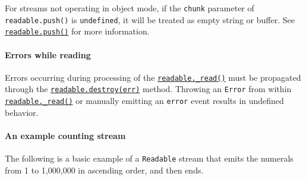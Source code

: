 For streams not operating in object mode, if the \texttt{chunk}
parameter of \texttt{readable.push()} is \texttt{undefined}, it will be
treated as empty string or buffer. See
\hyperref[readablepush]{\texttt{readable.push(\textquotesingle{}\textquotesingle{})}}
for more information.

\paragraph{Errors while reading}\label{errors-while-reading}

Errors occurring during processing of the
\hyperref[readable_readsize]{\texttt{readable.\_read()}} must be
propagated through the
\hyperref[readable_destroyerr-callback]{\texttt{readable.destroy(err)}}
method. Throwing an \texttt{Error} from within
\hyperref[readable_readsize]{\texttt{readable.\_read()}} or manually
emitting an \texttt{\textquotesingle{}error\textquotesingle{}} event
results in undefined behavior.

\begin{Shaded}
\begin{Highlighting}[]
\OperatorTok{=} \NormalTok{(}\NormalTok{)}\OperatorTok{;}

\OperatorTok{=}  \NormalTok{(\{}
    \OperatorTok{=} \NormalTok{()}\OperatorTok{;}
      \OperatorTok{;}
\NormalTok{    \} }\NormalTok{ \{}
\NormalTok{    \}}
\NormalTok{  \}}\OperatorTok{,}
\NormalTok{\})}\OperatorTok{;}
\end{Highlighting}
\end{Shaded}

\paragraph{An example counting stream}\label{an-example-counting-stream}

The following is a basic example of a \texttt{Readable} stream that
emits the numerals from 1 to 1,000,000 in ascending order, and then
ends.

